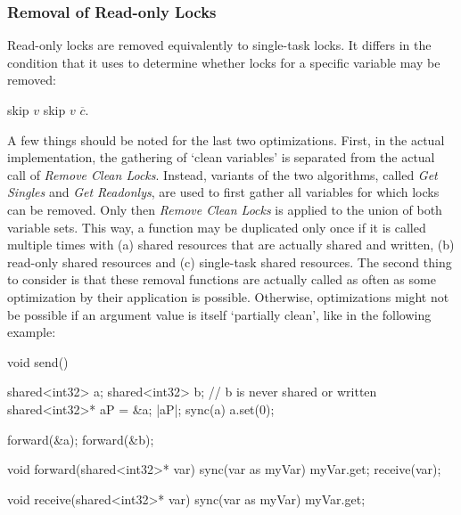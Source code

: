 \subsubsection{Removal of Read-only Locks}
Read-only locks are removed equivalently to single-task locks. It differs in the condition that it uses to determine whether locks for a specific variable may be removed: 
\begin{algorithmic}
 
    \State skip $v$
    \State skip $v$
  \EndIf
  \State $\overline{c}$. 
\EndFor
\State {}
\EndFunction
\end{algorithmic}
A few things should be noted for the last two optimizations. First, in the actual implementation, the gathering of `clean variables' is separated from the actual call of \textit{Remove Clean Locks}. Instead, variants of the two algorithms, called \textit{Get Singles} and \textit{Get Readonlys}, are used to first gather all variables for which locks can be removed. Only then \textit{Remove Clean Locks} is applied to the union of both variable sets. This way, a function may be duplicated only once if it is called multiple times with (a) shared resources that are actually shared and written, (b) read-only shared resources and (c) single-task shared resources. The second thing to consider is that these removal functions are actually called as often as some optimization by their application is possible. Otherwise, optimizations might not be possible if an argument value is itself `partially clean', like  in the following example:
\begin{ccode}
void send() {
  shared<int32> a;
  shared<int32> b;          // b is never shared or written
  shared<int32>* aP = &a;
  |aP|;
  sync(a) { a.set(0); }
  
  forward(&a);
  forward(&b);
}

void forward(shared<int32>* var) {
  sync(var as myVar) { myVar.get; }
  receive(var);
}

void receive(shared<int32>* var) {
  sync(var as myVar) { myVar.get; }
}
\end{ccode} 
